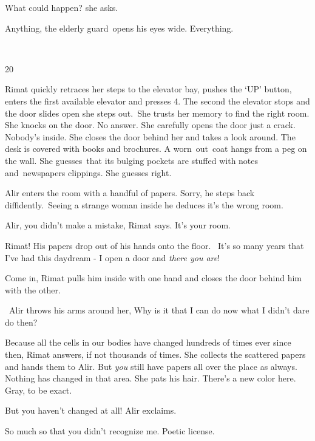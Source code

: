 \documentclass[letterpaper]{article}
\begin{document}
{\textquotedbl}What could happen?{\textquotedbl} she asks.

{\textquotedbl}Anything,{\textquotedbl} the elderly guard\ opens his eyes wide.
{\textquotedbl}Everything.{\textquotedbl}

~

20~

Rimat quickly retraces her steps to the elevator bay, pushes the `UP' button, enters the first available elevator and
presses 4. The second the elevator stops and the door slides open she steps out.\ She trusts her memory to find the
right room. She knocks on the door. No answer. She carefully opens the door just a crack. Nobody's inside. She closes
the door behind her and takes a look around. The desk is covered with books and brochures. A worn\ out\ coat hangs from
a peg on the wall. She guesses\ that its bulging pockets are stuffed with notes and\textcolor{red}{\ }newspapers
clippings. She guesses right.\ 

Alir enters the room with a handful of papers. {\textquotedbl}Sorry,{\textquotedbl} he steps back diffidently.\ Seeing a
strange woman inside he deduces it's the wrong room. 

{\textquotedbl}Alir, you didn't make a mistake,{\textquotedbl} Rimat says. {\textquotedbl}It's your room.{\textquotedbl}


{\textquotedbl}Rimat!{\textquotedbl} His papers drop out of his hands onto the floor.~ {\textquotedbl}It's so many years
that I've had this daydream - I open a door and \textit{there you are}!{\textquotedbl}

{\textquotedbl}Come in,{\textquotedbl} Rimat pulls him inside with one hand and closes the door behind him with the
other.

~Alir throws his arms around her, {\textquotedbl}Why is it that I can do now what I didn't dare do then?{\textquotedbl}

{\textquotedbl}Because all the cells in our bodies have changed hundreds of times ever since then,{\textquotedbl} Rimat
answers, {\textquotedbl}if not thousands of times.{\textquotedbl} She collects the scattered papers and hands them to
Alir. {\textquotedbl}But \textit{you} still have papers all over the place as always. Nothing has changed in that
area.{\textquotedbl} She pats his hair. {\textquotedbl}There's a new color here. Gray, to be exact.{\textquotedbl} 

{\textquotedbl}But you haven't changed at all!{\textquotedbl} Alir exclaims.

{\textquotedbl}So much so that you didn't recognize me. Poetic license.{\textquotedbl} 
\end{document}
